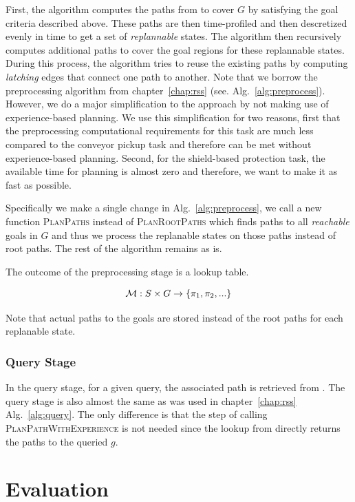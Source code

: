 \documentclass[a4paper]{report}
\begin{document}
First, the algorithm computes the paths from \Shome to cover $G$ by satisfying the goal criteria described above. These paths are then time-profiled and then descretized evenly in time to get a set of \emph{replannable} states. The algorithm then recursively computes additional paths to cover the goal regions for these replannable states. During this process, the algorithm tries to reuse the existing paths by computing \emph{latching} edges that connect one path to another. Note that we borrow the preprocessing algorithm from chapter~\ref{chap:rss} (see. Alg.~\ref{alg:preprocess}). However, we do a major simplification to the approach by not making use of experience-based planning. We use this simplification for two reasons, first that the preprocessing computational requirements for this task are much less compared to the conveyor pickup task and therefore can be met without experience-based planning. Second, for the shield-based protection task, the available time for planning is almost zero and therefore, we want to make it as fast as possible.

Specifically we make a single change in Alg.~\ref{alg:preprocess}, we call a new function \textsc{PlanPaths} instead of \textsc{PlanRootPaths} which finds paths to all \emph{reachable} goals in $G$ and thus we process the replanable states on those paths instead of root paths. The rest of the algorithm remains as is.

The outcome of the preprocessing stage is a lookup table.

$$
\mathcal{M} : S \times G \rightarrow \{\pi_1, \pi_2, ...\}
$$

Note that actual paths to the goals are stored instead of the root paths for each replanable state.

\subsubsection{Query Stage}
In the query stage, for a given query, the associated path is retrieved from \calM.
The query stage is also almost the same as was used in chapter~\ref{chap:rss} Alg.~\ref{alg:query}. The only difference is that the step of calling \textsc{PlanPathWithExperience} is not needed since the lookup from \calM directly returns the paths to the queried $g$.

\section{Evaluation}
\end{document}
